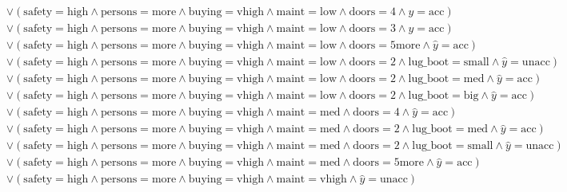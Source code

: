 \begin{scriptsize}
\[\begin{aligned}
  \\ & \lor (\text{safety}=\text{high} \land \text{persons}=\text{more} \land \text{buying}=\text{vhigh} \land \text{maint}=\text{low} \land \text{doors}=\text{4} \land \hat{y}=\text{acc})
  \\ & \lor (\text{safety}=\text{high} \land \text{persons}=\text{more} \land \text{buying}=\text{vhigh} \land \text{maint}=\text{low} \land \text{doors}=\text{3} \land \hat{y}=\text{acc})
  \\ & \lor (\text{safety}=\text{high} \land \text{persons}=\text{more} \land \text{buying}=\text{vhigh} \land \text{maint}=\text{low} \land \text{doors}=\text{5more} \land \hat{y}=\text{acc})
  \\ & \lor (\text{safety}=\text{high} \land \text{persons}=\text{more} \land \text{buying}=\text{vhigh} \land \text{maint}=\text{low} \land \text{doors}=\text{2} \land \text{lug_boot}=\text{small} \land \hat{y}=\text{unacc})
  \\ & \lor (\text{safety}=\text{high} \land \text{persons}=\text{more} \land \text{buying}=\text{vhigh} \land \text{maint}=\text{low} \land \text{doors}=\text{2} \land \text{lug_boot}=\text{med} \land \hat{y}=\text{acc})
  \\ & \lor (\text{safety}=\text{high} \land \text{persons}=\text{more} \land \text{buying}=\text{vhigh} \land \text{maint}=\text{low} \land \text{doors}=\text{2} \land \text{lug_boot}=\text{big} \land \hat{y}=\text{acc})
  \\ & \lor (\text{safety}=\text{high} \land \text{persons}=\text{more} \land \text{buying}=\text{vhigh} \land \text{maint}=\text{med} \land \text{doors}=\text{4} \land \hat{y}=\text{acc})
  \\ & \lor (\text{safety}=\text{high} \land \text{persons}=\text{more} \land \text{buying}=\text{vhigh} \land \text{maint}=\text{med} \land \text{doors}=\text{2} \land \text{lug_boot}=\text{med} \land \hat{y}=\text{acc})
  \\ & \lor (\text{safety}=\text{high} \land \text{persons}=\text{more} \land \text{buying}=\text{vhigh} \land \text{maint}=\text{med} \land \text{doors}=\text{2} \land \text{lug_boot}=\text{small} \land \hat{y}=\text{unacc})
  \\ & \lor (\text{safety}=\text{high} \land \text{persons}=\text{more} \land \text{buying}=\text{vhigh} \land \text{maint}=\text{med} \land \text{doors}=\text{5more} \land \hat{y}=\text{acc})
  \\ & \lor (\text{safety}=\text{high} \land \text{persons}=\text{more} \land \text{buying}=\text{vhigh} \land \text{maint}=\text{vhigh} \land \hat{y}=\text{unacc})

\end{aligned}\]
\end{scriptsize}
